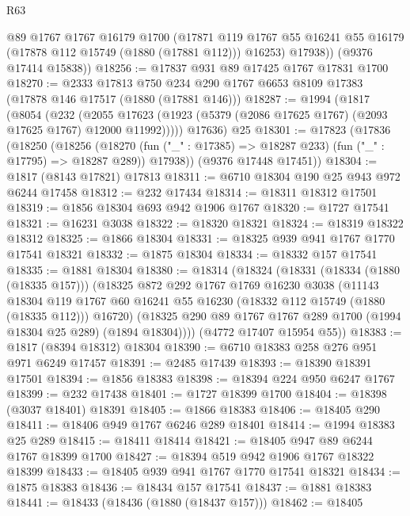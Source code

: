 \begin{lexlean}{R63}
\begin{coremodule}
          @89
          @1767
          @1767
          @16179
          @1700
          (@17871
            @119
            @1767
            @55
            @16241
            @55
            @16179
            (@17878 @112 @15749 (@1880 (@17881 @112)))
            @16253)
          @17938))
      (@9376 @17414 @15838))
@18256 := @17837 @931 @89 @17425 @1767 @17831 @1700
@18270 := @2333
    @17813
    @750
    @234
    @290
    @1767
    @6653
    @8109
    @17383
    (@17878 @146 @17517 (@1880 (@17881 @146)))
@18287 := @1994
    (@1817
      (@8054
        (@232
          (@2055 @17623 (@1923 (@5379 (@2086 @17625 @1767) (@2093 @17625 @1767) @12000 @11992)))))
      @17636)
    @25
@18301 := @17823
    (@17836
      (@18250
        (@18256
          (@18270 (fun ("_" : @17385) => @18287 @233) (fun ("_" : @17795) => @18287 @289))
          @17938))
      (@9376 @17448 @17451))
@18304 := @1817 (@8143 @17821) @17813
@18311 := @6710 @18304 @190 @25 @943 @972 @6244 @17458
@18312 := @232 @17434
@18314 := @18311 @18312 @17501
@18319 := @1856 @18304 @693 @942 @1906 @1767
@18320 := @1727 @17541
@18321 := @16231 @3038
@18322 := @18320 @18321
@18324 := @18319 @18322 @18312
@18325 := @1866 @18304
@18331 := @18325 @939 @941 @1767 @1770 @17541 @18321
@18332 := @1875 @18304
@18334 := @18332 @157 @17541
@18335 := @1881 @18304
@18380 := @18314
    (@18324
      (@18331
        (@18334 (@1880 (@18335 @157)))
        (@18325
          @872
          @292
          @1767
          @1769
          @16230
          @3038
          (@11143
            @18304
            @119
            @1767
            @60
            @16241
            @55
            @16230
            (@18332 @112 @15749 (@1880 (@18335 @112)))
            @16720)
          (@18325 @290 @89 @1767 @1767 @289 @1700 (@1994 @18304 @25 @289) (@1894 @18304))))
      (@4772 @17407 @15954 @55))
@18383 := @1817 (@8394 @18312) @18304
@18390 := @6710 @18383 @258 @276 @951 @971 @6249 @17457
@18391 := @2485 @17439
@18393 := @18390 @18391 @17501
@18394 := @1856 @18383
@18398 := @18394 @224 @950 @6247 @1767
@18399 := @232 @17438
@18401 := @1727 @18399 @1700
@18404 := @18398 (@3037 @18401) @18391
@18405 := @1866 @18383
@18406 := @18405 @290
@18411 := @18406 @949 @1767 @6246 @289 @18401
@18414 := @1994 @18383 @25 @289
@18415 := @18411 @18414
@18421 := @18405 @947 @89 @6244 @1767 @18399 @1700
@18427 := @18394 @519 @942 @1906 @1767 @18322 @18399
@18433 := @18405 @939 @941 @1767 @1770 @17541 @18321
@18434 := @1875 @18383
@18436 := @18434 @157 @17541
@18437 := @1881 @18383
@18441 := @18433 (@18436 (@1880 (@18437 @157)))
@18462 := @18405

\end{coremodule}
\end{lexlean}
